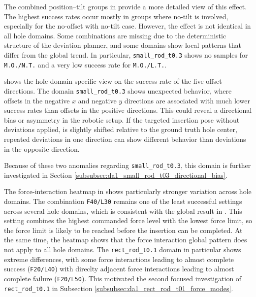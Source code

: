 The combined position--tilt groups in  provide a more detailed view of this effect. The highest success rates occur mostly in groups where no-tilt is involved, especially for the no-offset with no-tilt case. However, the effect is not identical in all hole domains. Some combinations are missing due to the deterministic structure of the deviation planner, and some domains show local patterns that differ from the global trend. In particular, \texttt{small\_rod\_t0.3} shows no samples for \texttt{M.O./N.T.} and a very low success rate for \texttt{M.O./L.T.}. 

 shows the hole domain specific view on the success rate of the five offset-directions. The domain \texttt{small\_rod\_t0.3} shows unexpected behavior, where offsets in the negative $x$ and negative $y$ directions are associated with much lower success rates than offsets in the positive directions. This could reveal a directional bias or asymmetry in the robotic setup. If the targeted insertion pose without deviations applied, is slightly shifted relative to the ground truth hole center, repeated deviations in one direction can show different behavior than deviations in the opposite direction.

Because of these two anomalies regarding \texttt{small\_rod\_t0.3}, this domain is further investigated in Section \ref{subsubsec:da1_small_rod_t03_directional_bias}.

The force-interaction heatmap in  shows particularly stronger variation across hole domains. The combination \texttt{F40/L30} remains one of the least successful settings across several hole domains, which is consistent with the global result in . This setting combines the highest commanded force level with the lowest force limit, so the force limit is likely to be reached before the insertion can be completed. At the same time, the heatmap shows that the force interaction global pattern does not apply to all hole domains. The \texttt{rect\_rod\_t0.1} domain in particular shows extreme differences, with some force interactions leading to almost complete success (\texttt{F20/L40}) with direclty adjacent force interactions leading to almost complete failure (\texttt{F20/L50}). This motivated the second focused investigation of \texttt{rect\_rod\_t0.1} in Subsection \ref{subsubsec:da1_rect_rod_t01_force_modes}.


